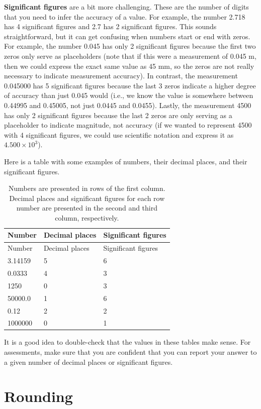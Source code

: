 \documentclass[
]{scrbook}
\begin{document}
\textbf{Significant figures} are a bit more challenging.
These are the number of digits that you need to infer the accuracy of a value.
For example, the number 2.718 has 4 significant figures and 2.7 has 2 significant figures. This sounds straightforward, but it can get confusing when numbers start or end with zeros.
For example, the number 0.045 has only 2 significant figures because the first two zeros only serve as placeholders (note that if this were a measurement of 0.045 m, then we could express the exact same value as 45 mm, so the zeros are not really necessary to indicate measurement accuracy).
In contrast, the measurement 0.045000 has 5 significant figures because the last 3 zeros indicate a higher degree of accuracy than just 0.045 would (i.e., we know the value is somewhere between 0.44995 and 0.45005, not just 0.0445 and 0.0455).
Lastly, the measurement 4500 has only 2 significant figures because the last 2 zeros are only serving as a placeholder to indicate magnitude, not accuracy (if we wanted to represent 4500 with 4 significant figures, we could use scientific notation and express it as \(4.500 \times 10^3\)).

Here is a table with some examples of numbers, their decimal places, and their significant figures.

\begin{longtable}[]{@{}lll@{}}
\caption{Numbers are presented in rows of the first column. Decimal places and significant figures for each row number are presented in the second and third column, respectively.}\tabularnewline
\toprule
Number & Decimal places & Significant figures \\
\midrule
\endfirsthead
\toprule
Number & Decimal places & Significant figures \\
\midrule
\endhead
3.14159 & 5 & 6 \\
0.0333 & 4 & 3 \\
1250 & 0 & 3 \\
50000.0 & 1 & 6 \\
0.12 & 2 & 2 \\
1000000 & 0 & 1 \\
\bottomrule
\end{longtable}

It is a good idea to double-check that the values in these tables make sense.
For assessments, make sure that you are confident that you can report your answer to a given number of decimal places or significant figures.

\hypertarget{rounding}{%
\section{Rounding}\label{rounding}}
\end{document}
